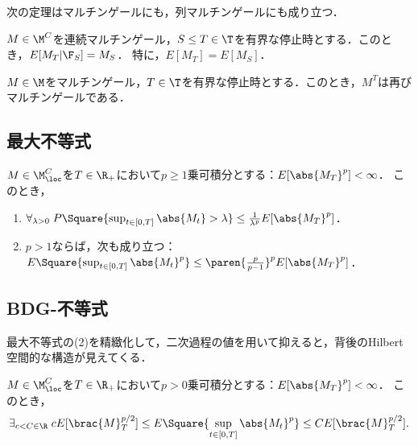 \documentclass[uplatex,dvipdfmx]{jsreport}
\begin{document}
\begin{tcolorbox}[colframe=ForestGreen, colback=ForestGreen!10!white,breakable,colbacktitle=ForestGreen!40!white,coltitle=black,fonttitle=\bfseries\sffamily,
title=]
    次の定理はマルチンゲールにも，列マルチンゲールにも成り立つ．
\end{tcolorbox}

\begin{theorem}
    $M\in\M^C$を連続マルチンゲール，$S\le T\in\T$を有界な停止時とする．このとき，$E[M_T|\F_S]=M_S$．
    特に，$E[M_T]=E[M_S]$．
\end{theorem}

\begin{corollary}
    $M\in\M$をマルチンゲール，$T\in\T$を有界な停止時とする．このとき，$M^T$は再びマルチンゲールである．
\end{corollary}

\subsection{最大不等式}

\begin{theorem}[Doob]
    $M\in\M_\loc^C$を$T\in\R_+$において$p\ge1$乗可積分とする：$E[\abs{M_T}^p]<\infty$．
    このとき，
    \begin{enumerate}
        \item $\forall_{\lambda>0}\;P\Square{\sup_{t\in[0,T]}\abs{M_t}>\lambda}\le\frac{1}{\lambda^p}E[\abs{M_T}^p]$．
        \item $p>1$ならば，次も成り立つ：$E\Square{\sup_{t\in[0,T]}\abs{M_t}^p}\le\paren{\frac{p}{p-1}}^pE[\abs{M_T}^p]$．
    \end{enumerate}
\end{theorem}

\subsection{BDG-不等式}

\begin{tcolorbox}[colframe=ForestGreen, colback=ForestGreen!10!white,breakable,colbacktitle=ForestGreen!40!white,coltitle=black,fonttitle=\bfseries\sffamily,
title=Burkholder-David-Gundy不等式]
    最大不等式の(2)を精緻化して，二次過程の値を用いて抑えると，背後のHilbert空間的な構造が見えてくる．
\end{tcolorbox}

\begin{theorem}
    $M\in\M_\loc^C$を$T\in\R_+$において$p>0$乗可積分とする：$E[\abs{M_T}^p]<\infty$．
    このとき，
    \[\exists_{c<C\in\R}\;cE[\brac{M}_T^{p/2}]\le E\Square{\sup_{t\in[0,T]}\abs{M_t}^p}\le CE[\brac{M}_T^{p/2}].\]
\end{theorem}
\end{document}
